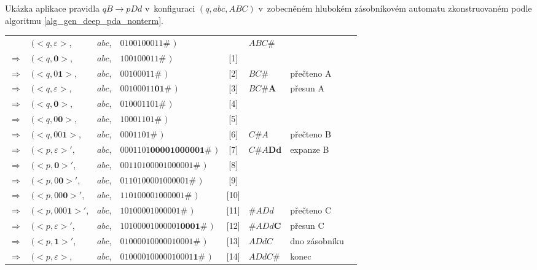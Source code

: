 \begin{Example}
\setlength{\tabcolsep}{\deftabcolsep}

\newpage
Ukázka aplikace pravidla $qB \rightarrow p Dd$ v~konfiguraci $(q, abc, ABC)$ v~zobecněném hlubokém zásobníkovém automatu zkonstruovaném podle algoritmu \ref{alg_gen_deep_pda_nonterm}.

\begin{center}
\begin{tabular}{llllc|l|ll}
                & $( <q, \varepsilon>$,  & $abc$, & $0100100011\#$         $)$ && $ABC\#$ \\
$\Rightarrow$   & $( <q, \mathbf{0}>$,   & $abc$, & $100100011\#$         $)$ &[1]& \\
$\Rightarrow$   & $( <q, 0\mathbf{1}>$,  & $abc$, & $00100011\#$         $)$ &[2]&   $BC\#$ & přečteno A~\\
$\Rightarrow$   & $( <q, \varepsilon>$,  & $abc$, & $00100011\mathbf{01}\#$         $)$ &[3]& $BC\#\mathbf{A}$ & přesun A~\\
$\Rightarrow$   & $( <q, \mathbf{0}>$,   & $abc$, & $010001101\#$         $)$ &[4]& \\
$\Rightarrow$   & $( <q, 0\mathbf{0}>$,  & $abc$, & $10001101\#$         $)$ &[5]& \\
$\Rightarrow$   & $( <q, 00\mathbf{1}>$, & $abc$, & $0001101\#$         $)$ &[6]&    $C\#A$ & přečteno B \\
$\Rightarrow$   & $( <p,\varepsilon>'$,  & $abc$, & $0001101\mathbf{00001000001}\#$         $)$ &[7]& $C\#A\mathbf{Dd}$ & expanze B \\
$\Rightarrow$   & $( <p,\mathbf{0}>'$,   & $abc$, & $00110100001000001\#$         $)$ &[8]& \\
$\Rightarrow$   & $( <p,0\mathbf{0}>'$,  & $abc$, & $0110100001000001\#$         $)$ &[9]& \\
$\Rightarrow$   & $( <p,00\mathbf{0}>'$, & $abc$, & $110100001000001\#$         $)$ &[10]& \\
$\Rightarrow$   & $( <p,000\mathbf{1}>'$,& $abc$, & $10100001000001\#$         $)$ &[11]& $\#ADd$ & přečteno C  \\
$\Rightarrow$   & $( <p,\varepsilon>'$,  & $abc$, & $10100001000001\mathbf{0001}\#$         $)$ &[12]& $\#ADd\mathbf{C}$ & přesun C \\
$\Rightarrow$   & $( <p,\mathbf{1}>'$,   & $abc$, & $01000010000010001\#$         $)$ &[13]& $ADdC$ & dno zásobníku \\
$\Rightarrow$   & $( <p,\varepsilon>$,   & $abc$, & $01000010000010001\mathbf{1}\#$         $)$ &[14]& $ADdC\mathbf{\#}$ & konec


\end{tabular}
\end{center}


\end{Example}
